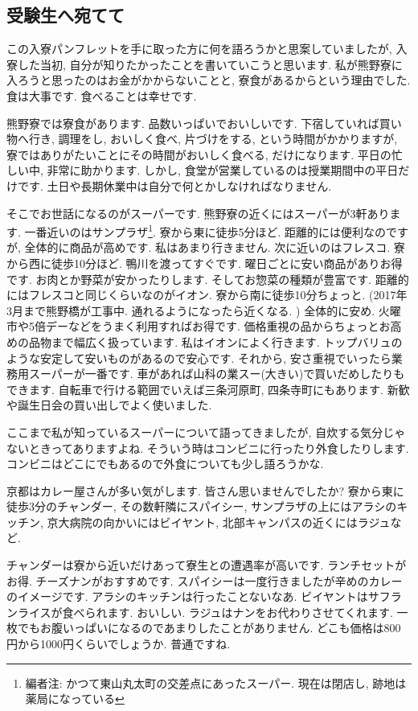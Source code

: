 \documentclass[10pt,b5jsbook,dvips,dvipdfmx,openany]{jsbook}
\theoremstyle{definition}
\begin{document}
		\subsection{受験生へ宛てて}

		この入寮パンフレットを手に取った方に何を語ろうかと思案していましたが, 入寮した当初, 自分が知りたかったことを書いていこうと思います.
私が熊野寮に入ろうと思ったのはお金がかからないことと, 寮食があるからという理由でした. 食は大事です. 食べることは幸せです.

		熊野寮では寮食があります. 品数いっぱいでおいしいです. 下宿していれば買い物へ行き, 調理をし, おいしく食べ, 片づけをする, という時間がかかりますが, 寮ではありがたいことにその時間がおいしく食べる, だけになります. 平日の忙しい中, 非常に助かります. しかし, 食堂が営業しているのは授業期間中の平日だけです. 土日や長期休業中は自分で何とかしなければなりません.

		そこでお世話になるのがスーパーです. 熊野寮の近くにはスーパーが3軒あります. 一番近いのはサンプラザ\footnote{編者注: かつて東山丸太町の交差点にあったスーパー. 現在は閉店し, 跡地は薬局になっている}. 寮から東に徒歩5分ほど. 距離的には便利なのですが, 全体的に商品が高めです. 私はあまり行きません. 次に近いのはフレスコ. 寮から西に徒歩10分ほど. 鴨川を渡ってすぐです. 曜日ごとに安い商品がありお得です. お肉とか野菜が安かったりします. そしてお惣菜の種類が豊富です. 距離的にはフレスコと同じくらいなのがイオン. 寮から南に徒歩10分ちょっと. (2017年3月まで熊野橋が工事中. 通れるようになったら近くなる. ) 全体的に安め. 火曜市や5倍デーなどをうまく利用すればお得です. 価格重視の品からちょっとお高めの品物まで幅広く扱っています. 私はイオンによく行きます. トップバリュのような安定して安いものがあるので安心です. それから, 安さ重視でいったら業務用スーパーが一番です. 車があれば山科の業スー(大きい)で買いだめしたりもできます. 自転車で行ける範囲でいえば三条河原町, 四条寺町にもあります. 新歓や誕生日会の買い出しでよく使いました.

		ここまで私が知っているスーパーについて語ってきましたが, 自炊する気分じゃないときってありますよね. そういう時はコンビニに行ったり外食したりします. コンビニはどこにでもあるので外食についても少し語ろうかな.

		京都はカレー屋さんが多い気がします. 皆さん思いませんでしたか? 寮から東に徒歩3分のチャンダー, その数軒隣にスパイシー, サンプラザの上にはアラシのキッチン, 京大病院の向かいにはビイヤント, 北部キャンパスの近くにはラジュなど.

		チャンダーは寮から近いだけあって寮生との遭遇率が高いです. ランチセットがお得. チーズナンがおすすめです. スパイシーは一度行きましたが辛めのカレーのイメージです. アラシのキッチンは行ったことないなあ. ビイヤントはサフランライスが食べられます. おいしい. ラジュはナンをお代わりさせてくれます. 一枚でもお腹いっぱいになるのであまりしたことがありません. どこも価格は800円から1000円くらいでしょうか. 普通ですね.
\end{document}
